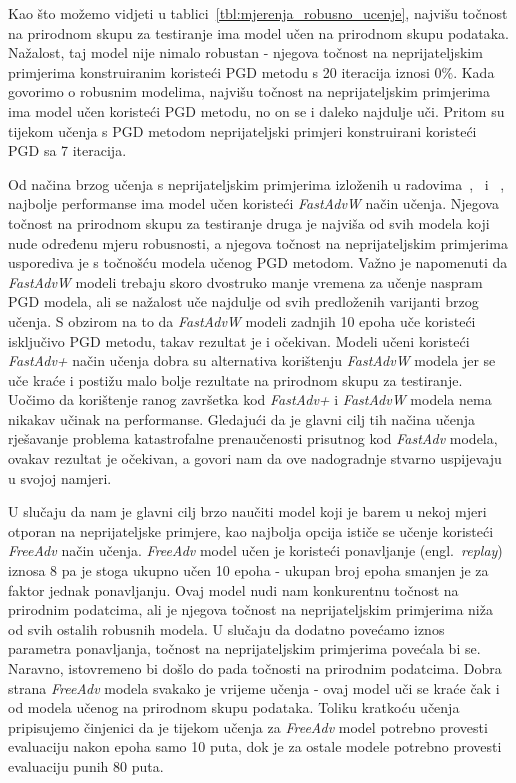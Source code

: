 \documentclass[times, utf8, zavrsni, numeric]{fer}
\begin{document}
Kao što možemo vidjeti u tablici~\ref{tbl:mjerenja_robusno_ucenje}, najvišu točnost na prirodnom skupu za testiranje ima model učen na prirodnom skupu podataka.
Nažalost, taj model nije nimalo robustan - njegova točnost na neprijateljskim primjerima konstruiranim koristeći PGD metodu s 20 iteracija iznosi $0\%$.
Kada govorimo o robusnim modelima, najvišu točnost na neprijateljskim primjerima ima model učen koristeći PGD metodu, no on se i daleko najdulje uči.
Pritom su tijekom učenja s PGD metodom neprijateljski primjeri konstruirani koristeći PGD sa 7 iteracija.

Od načina brzog učenja s neprijateljskim primjerima izloženih u radovima~\cite{shafahi2019adversarial},~\cite{wong2020fast} i ~\cite{li2020towards},
najbolje performanse ima model učen koristeći \textit{FastAdvW} način učenja. Njegova točnost na prirodnom skupu za testiranje druga je najviša od svih modela koji nude određenu mjeru robusnosti,
a njegova točnost na neprijateljskim primjerima usporediva je s točnošću modela učenog PGD metodom. 
Važno je napomenuti da \textit{FastAdvW} modeli trebaju skoro dvostruko manje vremena za učenje naspram PGD modela, ali se nažalost uče najdulje od svih predloženih varijanti brzog učenja.
S obzirom na to da \textit{FastAdvW} modeli zadnjih 10 epoha uče koristeći isključivo PGD metodu, takav rezultat je i očekivan.
Modeli učeni koristeći \textit{FastAdv+} način učenja dobra su alternativa korištenju \textit{FastAdvW} modela jer se uče kraće i postižu malo bolje rezultate na prirodnom skupu za testiranje.
Uočimo da korištenje ranog završetka kod \textit{FastAdv+} i \textit{FastAdvW} modela nema nikakav učinak na performanse. 
Gledajući da je glavni cilj tih načina učenja rješavanje problema katastrofalne prenaučenosti prisutnog kod \textit{FastAdv} modela, ovakav rezultat je očekivan, 
a govori nam da ove nadogradnje stvarno uspijevaju u svojoj namjeri.

\pagebreak

U slučaju da nam je glavni cilj brzo naučiti model koji je barem u nekoj mjeri otporan na neprijateljske primjere, kao najbolja opcija ističe se učenje koristeći \textit{FreeAdv} način učenja.
\textit{FreeAdv} model učen je koristeći ponavljanje (engl.\ \textit{replay}) iznosa 8 pa je stoga ukupno učen 10 epoha - ukupan broj epoha smanjen je za faktor jednak ponavljanju.
Ovaj model nudi nam konkurentnu točnost na prirodnim podatcima, ali je njegova točnost na neprijateljskim primjerima niža od svih ostalih robusnih modela.
U slučaju da dodatno povećamo iznos parametra ponavljanja, točnost na neprijateljskim primjerima povećala bi se. Naravno, istovremeno bi došlo do pada točnosti na prirodnim podatcima.
Dobra strana \textit{FreeAdv} modela svakako je vrijeme učenja - ovaj model uči se kraće čak i od modela učenog na prirodnom skupu podataka. 
Toliku kratkoću učenja pripisujemo činjenici da je tijekom učenja za \textit{FreeAdv} model potrebno provesti evaluaciju nakon epoha samo 10 puta, dok je za ostale modele potrebno provesti evaluaciju punih 80 puta.
\end{document}
